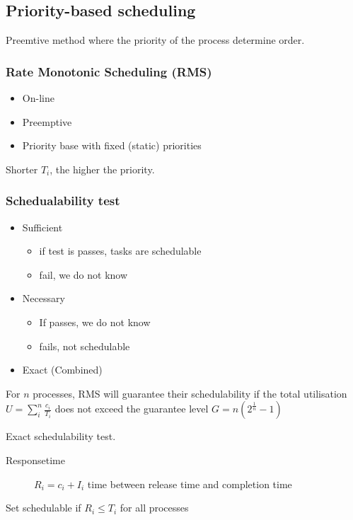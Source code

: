 \documentclass[course, english]{Notes}
\begin{document}
\subsection{Priority-based scheduling}
Preemtive method where the priority of the process determine order.

\subsubsection{Rate Monotonic Scheduling (RMS)}

\begin{itemize}
	\item On-line
	\item Preemptive
	\item Priority base with fixed (static) priorities
\end{itemize}

Shorter $T_i$, the higher the priority.

\subsubsection{Schedualability test}
\begin{itemize}
	\item Sufficient
		\begin{itemize}
			\item if test is passes, tasks are schedulable
			\item fail, we do not know
		\end{itemize}
	\item Necessary
		\begin{itemize}
			\item If passes, we do not know
			\item fails, not schedulable
		\end{itemize}
	\item Exact (Combined)
\end{itemize}

\begin{theorem}
	For $n$ processes, RMS will guarantee their schedulability if the total
	utilisation $U= \sum_i^n \frac{c_i}{T_i}$ does not exceed the guarantee
	level $G = n(2^{\frac{1}{n}}-1)$
	\label{Sufficient condition}
\end{theorem}

Exact schedulability test.
\begin{description}
	\item[Responsetime] $R_i=c_i+I_i$ time between release time and completion time
\end{description}
\begin{theorem}
	Set schedulable if $R_i\leq T_i$ for all processes
	\label{Exact schedulability test}
\end{theorem}
\end{document}
